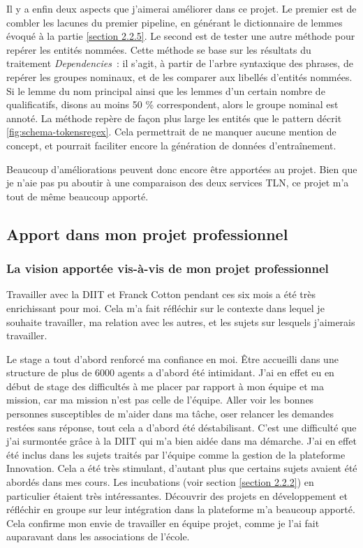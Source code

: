 Il y a enfin deux aspects que j'aimerai améliorer dans ce projet. Le premier est de combler les lacunes du premier pipeline, en générant le dictionnaire de lemmes évoqué à la partie \ref{section 2.2.5}. Le second est de tester une autre méthode pour repérer les entités nommées. Cette méthode se base sur les résultats du traitement \textit{Dependencies}~: il s'agit, à partir de l'arbre syntaxique des phrases, de repérer les groupes nominaux, et de les comparer aux libellés d'entités nommées. Si le lemme du nom principal ainsi que les lemmes d'un certain nombre de qualificatifs, disons au moins 50 \% correspondent, alors le groupe nominal est annoté. La méthode repère de façon plus large les entités que le pattern décrit \autoref{fig:schema-tokensregex}. Cela permettrait de ne manquer aucune mention de concept, et pourrait faciliter encore la génération de données d'entraînement.
\newline

Beaucoup d'améliorations peuvent donc encore être apportées au projet. Bien que je n'aie pas pu aboutir à une comparaison des deux services TLN, ce projet m'a tout de même beaucoup apporté.

\subsection{Apport dans mon projet professionnel}
\subsubsection{La vision apportée vis-à-vis de mon projet professionnel}

Travailler avec la DIIT et Franck Cotton pendant ces six mois a été très enrichissant pour moi. Cela m'a fait réfléchir sur le contexte dans lequel je souhaite travailler, ma relation avec les autres, et les sujets sur lesquels j'aimerais travailler.
\newline

Le stage a tout d'abord renforcé ma confiance en moi. Être accueilli dans une structure de plus de 6000 agents a d'abord été intimidant. J'ai en effet eu en début de stage des difficultés à me placer par rapport à mon équipe et ma mission, car ma mission n'est pas celle de l'équipe. Aller voir les bonnes personnes susceptibles de m'aider dans ma tâche, oser relancer les demandes restées sans réponse, tout cela a d'abord été déstabilisant. C'est une difficulté que j'ai surmontée grâce à la DIIT qui m'a bien aidée dans ma démarche. J'ai en effet été inclus dans les sujets traités par l'équipe comme la gestion de la plateforme Innovation. Cela a été très stimulant, d'autant plus que certains sujets avaient été abordés dans mes cours. Les incubations (voir section \ref{section 2.2.2}) en particulier étaient très intéressantes. Découvrir des projets en développement et réfléchir en groupe sur leur intégration dans la plateforme m'a beaucoup apporté. Cela confirme mon envie de travailler en équipe projet, comme je l'ai fait auparavant dans les associations de l'école.
\newline

